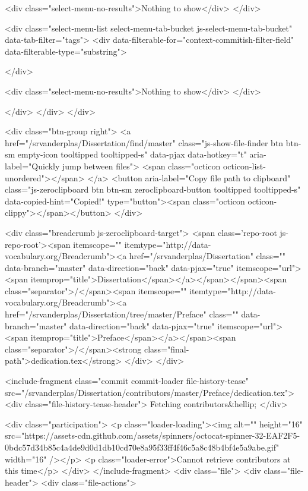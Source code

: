           <div class="select-menu-no-results">Nothing to show</div>
      </div>

      <div class="select-menu-list select-menu-tab-bucket js-select-menu-tab-bucket" data-tab-filter="tags">
        <div data-filterable-for="context-commitish-filter-field" data-filterable-type="substring">


        </div>

        <div class="select-menu-no-results">Nothing to show</div>
      </div>

    </div>
  </div>
</div>

  <div class="btn-group right">
    <a href="/srvanderplas/Dissertation/find/master"
          class="js-show-file-finder btn btn-sm empty-icon tooltipped tooltipped-s"
          data-pjax
          data-hotkey="t"
          aria-label="Quickly jump between files">
      <span class="octicon octicon-list-unordered"></span>
    </a>
    <button aria-label="Copy file path to clipboard" class="js-zeroclipboard btn btn-sm zeroclipboard-button tooltipped tooltipped-s" data-copied-hint="Copied!" type="button"><span class="octicon octicon-clippy"></span></button>
  </div>

  <div class="breadcrumb js-zeroclipboard-target">
    <span class='repo-root js-repo-root'><span itemscope="" itemtype="http://data-vocabulary.org/Breadcrumb"><a href="/srvanderplas/Dissertation" class="" data-branch="master" data-direction="back" data-pjax="true" itemscope="url"><span itemprop="title">Dissertation</span></a></span></span><span class="separator">/</span><span itemscope="" itemtype="http://data-vocabulary.org/Breadcrumb"><a href="/srvanderplas/Dissertation/tree/master/Preface" class="" data-branch="master" data-direction="back" data-pjax="true" itemscope="url"><span itemprop="title">Preface</span></a></span><span class="separator">/</span><strong class="final-path">dedication.tex</strong>
  </div>
</div>

<include-fragment class="commit commit-loader file-history-tease" src="/srvanderplas/Dissertation/contributors/master/Preface/dedication.tex">
  <div class="file-history-tease-header">
    Fetching contributors&hellip;
  </div>

  <div class="participation">
    <p class="loader-loading"><img alt="" height="16" src="https://assets-cdn.github.com/assets/spinners/octocat-spinner-32-EAF2F5-0bdc57d34b85c4a4de9d0d1db10cd70e8a95f33ff4f46c5a8c48b4bf4e5a9abe.gif" width="16" /></p>
    <p class="loader-error">Cannot retrieve contributors at this time</p>
  </div>
</include-fragment>
<div class="file">
  <div class="file-header">
    <div class="file-actions">

